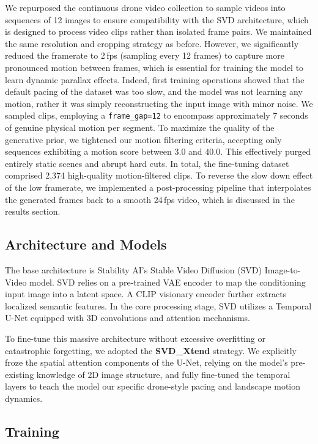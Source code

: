 \documentclass[10pt,twocolumn,letterpaper]{article}
\begin{document}
We repurposed the continuous drone video collection to sample videos into sequences of 12 images to ensure compatibility with the SVD architecture, which is designed to process video clips rather than isolated frame pairs. 
We maintained the same resolution and cropping strategy as before. 
However, we significantly reduced the framerate to 2\,fps (sampling every 12 frames) to capture more pronounced motion between frames, which is essential for training the model to learn dynamic parallax effects. 
Indeed, first training operations showed that the default pacing of the dataset was too slow, and the model was not learning any motion, rather it was simply reconstructing the input image with minor noise.
We sampled clips, employing a \texttt{frame\_gap=12} to encompass approximately 7 seconds of genuine physical motion per segment.
To maximize the quality of the generative prior, we tightened our motion filtering criteria, accepting only sequences exhibiting a motion score between $3.0$ and $40.0$. This effectively purged entirely static scenes and abrupt hard cuts. In total, the fine-tuning dataset comprised 2,374 high-quality motion-filtered clips.
To reverse the slow down effect of the low framerate, we implemented a post-processing pipeline that interpolates the generated frames back to a smooth 24\,fps video, which is discussed in the results section.

\subsection{Architecture and Models}

The base architecture is Stability AI's Stable Video Diffusion (SVD) Image-to-Video model. SVD relies on a pre-trained VAE encoder to map the conditioning input image into a latent space. A CLIP visionary encoder further extracts localized semantic features. In the core processing stage, SVD utilizes a Temporal U-Net equipped with 3D convolutions and attention mechanisms. 

To fine-tune this massive architecture without excessive overfitting or catastrophic forgetting, we adopted the \textbf{SVD\_Xtend} strategy. We explicitly froze the spatial attention components of the U-Net, relying on the model's pre-existing knowledge of 2D image structure, and fully fine-tuned the temporal layers to teach the model our specific drone-style pacing and landscape motion dynamics.

\subsection{Training}
\end{document}
